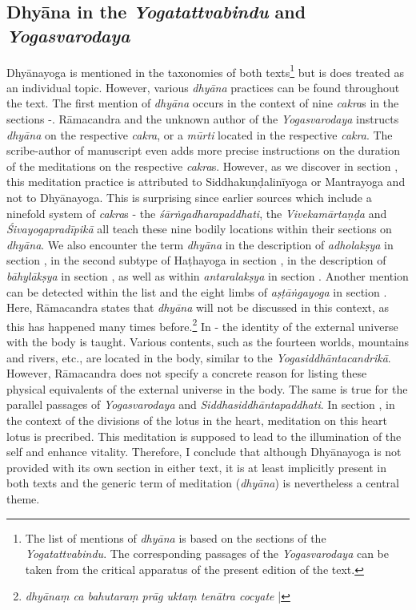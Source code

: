 \subsection{Dhyāna in the \textit{Yogatattvabindu} and \textit{Yogasvarodaya}}

Dhyānayoga is mentioned in the taxonomies of both texts\footnote{The list of mentions of \textit{dhyāna} is based on the sections of the \textit{Yogatattvabindu}. The corresponding passages of the \textit{Yogasvarodaya} can be taken from the critical apparatus of the present edition of the text.} but is does treated as an individual topic. However, various \textit{dhyāna} practices can be found throughout the text. The first mention of \textit{dhyāna} occurs in the context of nine \textit{cakra}s in the sections -. Rāmacandra and the unknown author of the \textit{Yogasvarodaya} instructs \textit{dhyāna} on the respective \textit{cakra}, or a \textit{mūrti} located in the respective \textit{cakra}. The scribe-author of manuscript  even adds more precise instructions on the duration of the meditations on the respective \textit{cakra}s. However, as we discover in section , this meditation practice is attributed to Siddhakuṇḍalinīyoga or Mantrayoga and not to Dhyānayoga. This is surprising since earlier sources which include a ninefold system of \textit{cakra}s - the \emph{śārṅgadharapaddhati}, the \emph{Vivekamārtaṇḍa} and \textit{Śivayogapradīpikā} all teach these nine bodily locations within their sections on \textit{dhyāna}. We also encounter the term \textit{dhyāna} in the description of \textit{adholakṣya} in section , in the second subtype of Haṭhayoga in section , in the description of \textit{bāhylākṣya} in section , as well as within \textit{antaralakṣya} in section . Another mention can be detected within the list and the eight limbs of \textit{aṣṭāṅgayoga} in section . Here, Rāmacandra states that \textit{dhyāna} will not be discussed in this context, as this has happened many times before.\footnote{\textit{dhyānaṃ ca bahutaraṃ prāg uktaṃ tenātra cocyate} |} In - the identity of the external universe with the body is taught. Various contents, such as the fourteen worlds, mountains and rivers, etc., are located in the body, similar to the \textit{Yogasiddhāntacandrikā}. However, Rāmacandra does not specify a concrete reason for listing these physical equivalents of the external universe in the body. The same is true for the parallel passages of \textit{Yogasvarodaya} and \textit{Siddhasiddhāntapaddhati}. In section , in the context of the divisions of the lotus in the heart, meditation on this heart lotus is precribed. This meditation is supposed to lead to the illumination of the self and enhance vitality. Therefore, I conclude that although Dhyānayoga is not provided with its own section in either text, it is at least implicitly present in both texts and the generic term of meditation (\textit{dhyāna}) is nevertheless a central theme. 

